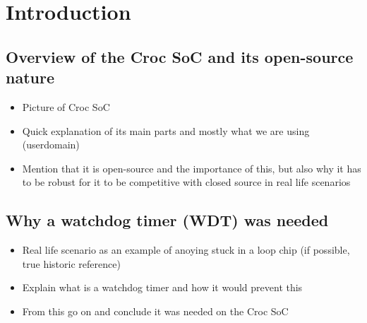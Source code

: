 
\chapter{Introduction}
\label{chap:introduction}

\section{Overview of the Croc SoC and its open-source nature}
\begin{itemize}
	\item Picture of Croc SoC
	\item Quick explanation of its main parts and mostly what we are using  (userdomain)
	\item Mention that it is open-source and the importance of this, but also why it has to be robust for it to be competitive with closed source in real life scenarios
\end{itemize}
\section{Why a watchdog timer (WDT) was needed}
\begin{itemize}
	\item Real life scenario as an example of anoying stuck in a loop chip (if possible, true historic reference)
	\item Explain what is a watchdog timer and how it would prevent this
	\item From this go on and conclude it was needed on the Croc SoC
\end{itemize}

